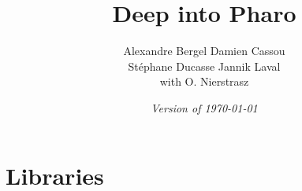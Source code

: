 \documentclass[a4paper,10pt,twoside]{book}
\begin{document}
\frontmatter
\setcounter{page}{1}
\pagestyle{headings}
\author{
	Alexandre Bergel\quad 
	Damien Cassou\quad \\
	St\'ephane Ducasse\quad 
	Jannik Laval\\ with O. Nierstrasz}
\title{\Huge\bf Deep into Pharo}
\isodate
\date{\emph{Version of \today}}
\maketitle




\tableofcontents
\sloppy %
\mainmatter






\part{Libraries}



 




\end{document}
